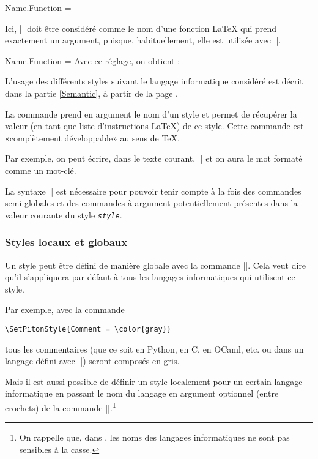 \documentclass[dvipsnames,svgnames]{article}
\begin{document}
\medskip
\begin{Code}
\SetPitonStyle
  { Name.Function = \bfseries \highLight[red!30] }
\end{Code}

Ici, |\highLight[red!30]| doit être considéré comme le nom d'une fonction LaTeX qui prend
exactement un argument, puisque, habituellement, elle est utilisée avec
||.

\medskip
\begingroup
\SetPitonStyle 
  { Name.Function = \bfseries \highLight[red!30] }
Avec ce réglage, on obtient : 
\endgroup

\bigskip
L'usage des différents styles suivant le langage informatique considéré est décrit dans la
partie \ref{Semantic}, à partir de la page \pageref{Semantic}.


\bigskip
{} La commande  prend en argument le
nom d'un style et permet de récupérer la valeur (en tant que liste d'instructions LaTeX)
de ce style. Cette commande est «complètement développable» au sens de TeX.

\smallskip
Par exemple, on peut écrire, dans le texte courant, |{}| et
on aura le mot {} formaté comme un mot-clé.

\smallskip
La syntaxe |{}| est nécessaire pour pouvoir
tenir compte à la fois des commandes semi-globales et des commandes à argument
potentiellement présentes dans la valeur courante du style \texttt{\textsl{style}}.


\subsubsection{Styles locaux et globaux}

Un style peut être défini de manière globale avec la commande |\SetPitonStyle|. Cela veut
dire qu'il s'appliquera par défaut à tous les langages informatiques qui utilisent ce
style.

\medskip
Par exemple, avec la commande 
\begin{Verbatim}
\SetPitonStyle{Comment = \color{gray}}
\end{Verbatim}
tous les commentaires (que ce soit en Python, en C, en OCaml, etc. ou dans un langage
défini avec |\NewPitonLanguage|) seront composés en gris.

\bigskip
Mais il est aussi possible de définir un style localement pour un certain langage
informatique en passant le nom du langage en argument optionnel (entre crochets) de la
commande |\SetPitonStyle|.\footnote{On rappelle que, dans , les noms des
  langages informatiques ne sont pas sensibles à la casse.}
\end{document}

